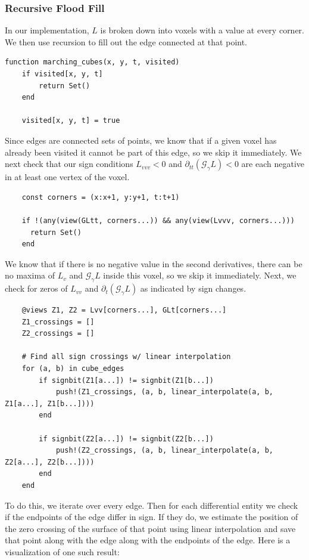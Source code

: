 \documentclass{article}
\begin{document}
\subsubsection{Recursive Flood Fill}
In our implementation, $L$ is broken down into voxels with a value at every corner.
We then use recursion to fill out the edge connected at that point.
\begin{lstlisting}
function marching_cubes(x, y, t, visited)
    if visited[x, y, t]
        return Set()
    end

    visited[x, y, t] = true
\end{lstlisting}
Since edges are connected sets of points, we know that if a given voxel has already been visited it cannot be part of this edge, so we skip it immediately.
We next check that our sign conditions $L_{vvv} < 0$ and $\partial_{tt}(\mathcal G_\gamma L) < 0$ are each negative in at least one vertex of the voxel.
\begin{lstlisting}
    const corners = (x:x+1, y:y+1, t:t+1)

    if !(any(view(GLtt, corners...)) && any(view(Lvvv, corners...)))
      return Set()
    end
\end{lstlisting}
We know that if there is no negative value in the second derivatives, there can be no maxima of $L_{v}$ and $\mathcal G_\gamma L$ inside this voxel, so we skip it immediately.
Next, we check for zeros of $L_{vv}$ and $\partial_{t} (\mathcal G_\gamma L)$ as indicated by sign changes.
\begin{lstlisting}
    @views Z1, Z2 = Lvv[corners...], GLt[corners...]
    Z1_crossings = []
    Z2_crossings = []

    # Find all sign crossings w/ linear interpolation
    for (a, b) in cube_edges
        if signbit(Z1[a...]) != signbit(Z1[b...])
            push!(Z1_crossings, (a, b, linear_interpolate(a, b, Z1[a...], Z1[b...])))
        end

        if signbit(Z2[a...]) != signbit(Z2[b...])
            push!(Z2_crossings, (a, b, linear_interpolate(a, b, Z2[a...], Z2[b...])))
        end
    end
\end{lstlisting}
To do this, we iterate over every edge.
Then for each differential entity we check if the endpoints of the edge differ in sign.
If they do, we estimate the position of the zero crossing of the surface of that point using linear interpolation and save that point along with the edge along with the endpoints of the edge.
Here is a visualization of one such result:
\end{document}
